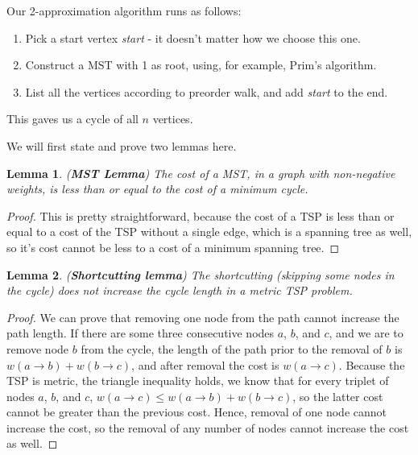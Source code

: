 \documentclass[12pt,twoside,notitlepage]{report}
\newtheorem{lemma}{Lemma}
\begin{document}
\smallskip

Our 2-approximation algorithm runs as follows: 

\begin{enumerate}

\item Pick a start vertex {\it start} - it doesn't matter how we choose this one.
\item Construct a MST with 1 as root, using, for example, Prim's algorithm.
\item List all the vertices according to preorder walk, and add {\it start} to the end.

\end{enumerate}

This gaves us a cycle of all $n$ vertices.

\smallskip

We will first state and prove two lemmas here.

\begin{lemma}

\label{mstlemma} ({\bf MST Lemma})
The cost of a MST, in a graph with non-negative weights, is less than or equal to the cost of a minimum cycle.

\end{lemma}

\begin{proof}

This is pretty straightforward, because the cost of a TSP is less than or equal to a cost of the TSP without a single edge, which is a spanning tree as well, so it's cost cannot be less to a cost of a minimum spanning tree.

\end{proof}

\begin{lemma}

\label{shortcutting} ({\bf Shortcutting lemma})
The shortcutting (skipping some nodes in the cycle) does not increase the cycle length in a metric TSP problem.

\end{lemma}

\begin{proof}

We can prove that removing one node from the path cannot increase the path length. If there are some three consecutive nodes $a$, $b$, and $c$, and we are to remove node $b$ from the cycle, the length of the path prior to the removal of $b$ is $w(a \rightarrow b) + w(b \rightarrow c)$, and after removal the cost is $w(a \rightarrow c)$. Because the TSP is metric, the triangle inequality holds, we know that for every triplet of nodes $a$, $b$, and $c$, $w(a \rightarrow c) \leq w(a \rightarrow b) + w(b \rightarrow c)$, so the latter cost cannot be greater than the previous cost. Hence, removal of one node cannot increase the cost, so the removal of any number of nodes cannot increase the cost as well.

\end{proof}
\end{document}
